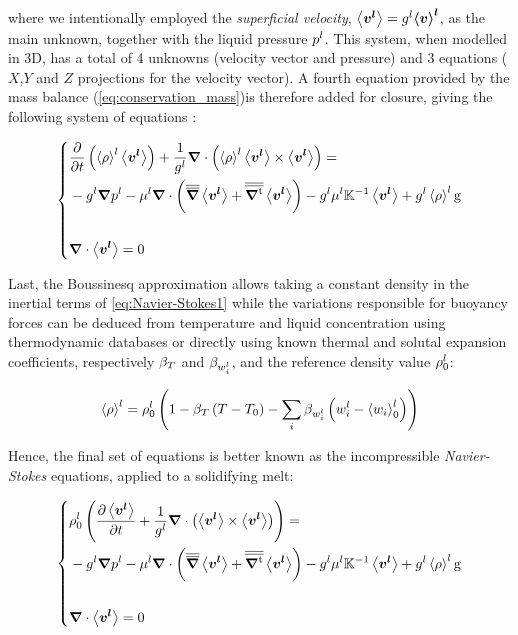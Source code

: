 where we intentionally employed the \emph{superficial velocity}, $\left \langle \boldsymbol{v^l} \right \rangle = {g^l} \boldsymbol{\left \langle v \right \rangle^l}$, as the main unknown, together with the liquid pressure ${p^l}$.
This system, when modelled in 3D, has a total of 4 unknowns (velocity vector and pressure) and 3 equations ($X$,$Y$ and $Z$ projections for the velocity vector).
A fourth equation provided by the mass balance (\cref{eq:conservation_mass})is therefore added for closure, giving the following system of equations :

\begin{equation}
\label{eq:Navier-Stokes1}
   \left\{
   \begin{aligned}
      & \temp{ \rhol \vit } + \frac{1}{\gl} \nabvec \cdot \brac{\rhol \vit \times \vit} = \\
	  &- \gl\nabvec \pl - \mul \nabvec \cdot \brac{\nabmat \vit + \nabmattransp \vit}
	  - \gl \mul \K^{-1} \vit + \gl \rhol \gravity\\ \\
      & \nabvec \cdot \vit =0
    \end{aligned}
    \right.
\end{equation}

Last, the Boussinesq approximation allows taking a constant density in the inertial terms of \cref{eq:Navier-Stokes1} 
while the variations responsible for buoyancy forces can be deduced from temperature and liquid concentration using thermodynamic
databases or directly using known thermal and solutal expansion coefficients, respectively $\beta_T$ and $\beta_{w_i^l}$, and the reference density value $\rho_{0}^{l}$:

\begin{equation}
\label{eq:rholiq}
 \rhol = \rholref \brac{ 1- \betaT \brac{T-\Tref} - \sum_{i} \betawil \brac{\wil-\wilref}}
\end{equation}

Hence, the final 
set of equations is better known as the incompressible \emph{Navier-Stokes} 
equations, applied to a solidifying melt:

\begin{equation}
\label{eq:conservation_momentum}
   \left\{
   \begin{aligned}
      & \rholref \brac{\tempup{ \vit } + \frac{1}{\gl} \nabvec \cdot \brac{\vit \times \vit}} = \\
	  &- \gl\nabvec \pl - \mul \nabvec \cdot \brac{\nabmat \vit + \nabmattransp \vit}
	  - \gl \mul \K^{-1} \vit + \gl \rhol \gravity\\ \\
      & \nabvec \cdot \vit =0
    \end{aligned}
    \right.
\end{equation}


